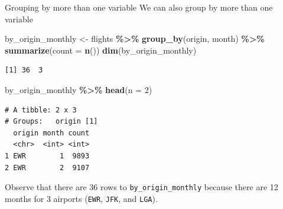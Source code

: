 \documentclass[
  ignorenonframetext,
]{beamer}
\newenvironment{Shaded}{\begin{snugshade}}{\end{snugshade}}
\newcommand{\AttributeTok}[1]{\textcolor[rgb]{0.13,0.29,0.53}{#1}}
\newcommand{\DecValTok}[1]{\textcolor[rgb]{0.00,0.00,0.81}{#1}}
\newcommand{\FunctionTok}[1]{\textcolor[rgb]{0.13,0.29,0.53}{\textbf{#1}}}
\newcommand{\NormalTok}[1]{#1}
\newcommand{\OtherTok}[1]{\textcolor[rgb]{0.56,0.35,0.01}{#1}}
\newcommand{\SpecialCharTok}[1]{\textcolor[rgb]{0.81,0.36,0.00}{\textbf{#1}}}
\begin{document}
\begin{frame}[fragile]{Grouping by more than one variable}
\protect\hypertarget{grouping-by-more-than-one-variable}{}
We can also group by more than one variable

\small

\begin{Shaded}
\begin{Highlighting}[]
\NormalTok{by\_origin\_monthly }\OtherTok{\textless{}{-}}\NormalTok{ flights }\SpecialCharTok{\%\textgreater{}\%} 
  \FunctionTok{group\_by}\NormalTok{(origin, month) }\SpecialCharTok{\%\textgreater{}\%} 
  \FunctionTok{summarize}\NormalTok{(}\AttributeTok{count =} \FunctionTok{n}\NormalTok{())}
\FunctionTok{dim}\NormalTok{(by\_origin\_monthly)}
\end{Highlighting}
\end{Shaded}

\begin{verbatim}
[1] 36  3
\end{verbatim}

\begin{Shaded}
\begin{Highlighting}[]
\NormalTok{by\_origin\_monthly }\SpecialCharTok{\%\textgreater{}\%} \FunctionTok{head}\NormalTok{(}\AttributeTok{n =} \DecValTok{2}\NormalTok{)}
\end{Highlighting}
\end{Shaded}

\begin{verbatim}
# A tibble: 2 x 3
# Groups:   origin [1]
  origin month count
  <chr>  <int> <int>
1 EWR        1  9893
2 EWR        2  9107
\end{verbatim}

\normalsize

Observe that there are 36 rows to \texttt{by\_origin\_monthly} because
there are 12 months for 3 airports (\texttt{EWR}, \texttt{JFK}, and
\texttt{LGA}).
\end{frame}
\end{document}
